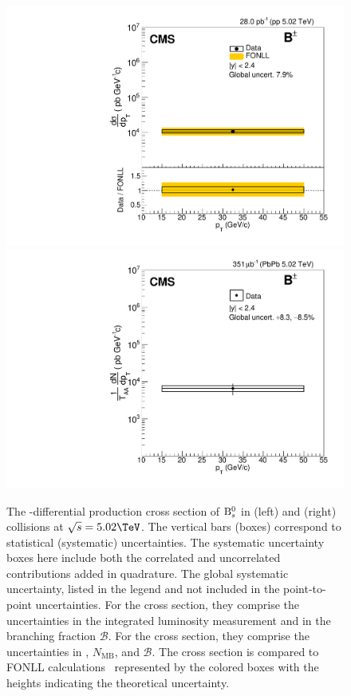 \begin{figure}[tb]
\centering
\includegraphics[width=.45\textwidth]{plots/canvasSigmaBplusRatiopp.pdf}
\includegraphics[width=.45\textwidth]{plots/canvasSigmaBplusRatioPbPb_0_100.pdf}
\caption{
The \pt-differential production cross section of ${\mathrm{B}_{s}^{0}}$ in \pp (left) and \PbPb (right) collisions at $\sqrts=5.02\TeV$. The vertical bars (boxes) correspond to statistical (systematic) uncertainties.
The systematic uncertainty boxes here include both the correlated and uncorrelated contributions added in quadrature. The global systematic uncertainty, listed in the legend and not included in the point-to-point uncertainties. 
For the \pp cross section, they comprise the uncertainties in the integrated luminosity measurement and in the branching fraction $\mathcal{B}$. For the \PbPb cross section, they comprise the uncertainties in \TAA, $N_{\text{MB}}$, and $\mathcal{B}$.
The \pp cross section is compared to FONLL calculations~\cite{FONLLcharmbottomPP1,FONLLcharmbottomPP2,FONLLcharmbottomPP3} represented by the colored boxes with the heights indicating the theoretical uncertainty.}
\label{fig:crosssections}
\end{figure}


